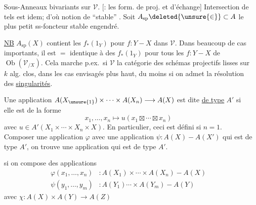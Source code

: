 
Sous-Anneaux bivariants sur $\mathcal V$. [:  les form. de proj. et d'échange]
Intersection de tels est idem; d'où notion de  ``stable'' . Soit $A_{\mathrm{sp}}\deleted{\unsure{\in}}\subset A$ le plus petit ss-foncteur stable engendré.

\uline{NB} $A_{\mathrm{sp}}(X)$ contient les $f_*(1_Y)$ pour $f:Y-X$ dans $\mathcal V$. Dans beaucoup de cas importants, il est $=$ identique à  des $f_*(1_Y)$ pour tous les $f:Y-X$ de $\operatorname{Ob}(\mathcal V_{/X})$. Cela marche p.ex.\ si $\mathcal V$ la catégorie des schémas projectifs lisses  sur $k$ alg. clos, dans les cas envisagés plus haut, du moins si on admet la résolution des \uline{singularités}.

Une application $A(X_{\unsure{1}})\times\cdots\times A(X_n)\longrightarrow A(X)$ est dite \uline{de type} $A'$ si elle est de la forme
\[
x_1,\ldots,x_n\longmapsto u(x_1\boxtimes\cdots\boxtimes x_n)
\]
avec $u\in A'(X_1\times\cdots\times X_n\times X)$. En  particulier, ceci est défini si $n=1$.
Composer une  application $\varphi$ avec une application $\psi:A(X)-A(X')$ qui est de type $A'$, on trouve une application qui est de type $A'$.

    si on compose des applications
\[
\begin{aligned}
\varphi(x_1,\ldots,x_n)&:A(X_1)\times\cdots\times A(X_n)-A(X)\\
\psi(y_1,\ldots,y_m)&:A(Y_1)\cdots\times A(Y_m)-A(Y)
\end{aligned}
\]
\deleted{\unsure{-}} avec $\chi:A(X)\times A(Y)\longrightarrow A(Z)$
